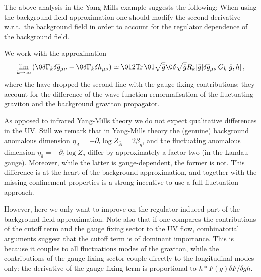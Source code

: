 \documentclass[11pt]{book} %
\newcommand{\Tr}{\mathrm{Tr}}
\begin{document}
{The above analysis in the Yang-Mills example suggests the following:
When using the background field approximation one should modify the
second derivative w.r.t.\ the background field in order to account
for the regulator dependence of the background field.

We work with the approximation
\begin{align}
	\lim_{k\to \infty} \left(\0{\delta \Gamma_k}{\delta\bar g_{\mu\nu}}-\0{\delta
		\Gamma_k}{\delta h_{\mu\nu}} \right)\simeq \012 \Tr\, \0{1}{ \sqrt{\bar g} } \0{\delta\sqrt{\bar g} R_k[\bar
	g]}{\delta \bar g_{\mu\nu}}\, G_k[\bar g, h]\,,
\label{eq:gravappNIk}\end{align}
where the have dropped the second line with the gauge fixing
contributions: they account for the difference of the wave function
renormalisation of the fluctuating graviton and the background
graviton propagator.

As opposed to infrared Yang-Mills theory we do
not expect qualitative differences in the UV. Still we remark that in
Yang-Mills theory the (genuine) background anomalous dimension
$\eta_{\bar A}=-\partial_t \log Z_{\bar A}=2 \beta_g$, and the
fluctuating anomalous dimension $\eta_{\bar a}=-\partial_t \log
Z_{\bar a}$ differ by approximately a factor two (in the Landau
gauge). Moreover, while the latter is gauge-dependent, the former is
not. This difference is at the heart of the background approximation,
and together with the missing confinement properties is a strong
incentive to use a full fluctuation approach.

However, here we only
want to improve on the regulator-induced part of the background field
approximation.
Note also that if one compares the contributions
of the cutoff term and the gauge fixing sector to the UV flow,
combinatorial arguments suggest that the cutoff term is of
dominant importance.
This is because it couples to all fluctuations modes
of the graviton, while the contributions of the gauge fixing sector
couple directly to the longitudinal modes only: the derivative of the gauge
fixing term is proportional to $h*F(\bar g) \delta F/\delta \bar g
h$.

}
\end{document}

